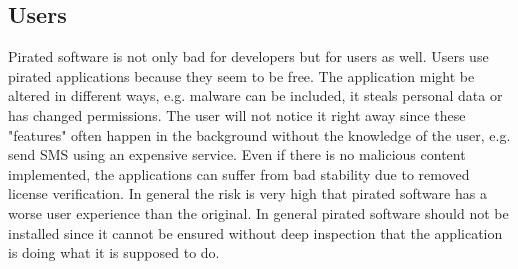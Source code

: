 \subsection{Users} \label{subsection:foundation-piracy-users}
Pirated software is not only bad for developers but for users as well.
Users use pirated applications because they seem to be free.
The application might be altered in different ways, e.g. malware can be included, it steals personal data or has changed permissions.
The user will not notice it right away since these "features" often happen in the background without the knowledge of the user, e.g. send SMS using an expensive service.
Even if there is no malicious content implemented, the applications can suffer from bad stability due to removed license verification.
In general the risk is very high that pirated software has a worse user experience than the original.\cite{bitdefenderPlagiarism}\cite{lierschDeveloperThreats}
\newline
In general pirated software should not be installed since it cannot be ensured without deep inspection that the application is doing what it is supposed to do.





